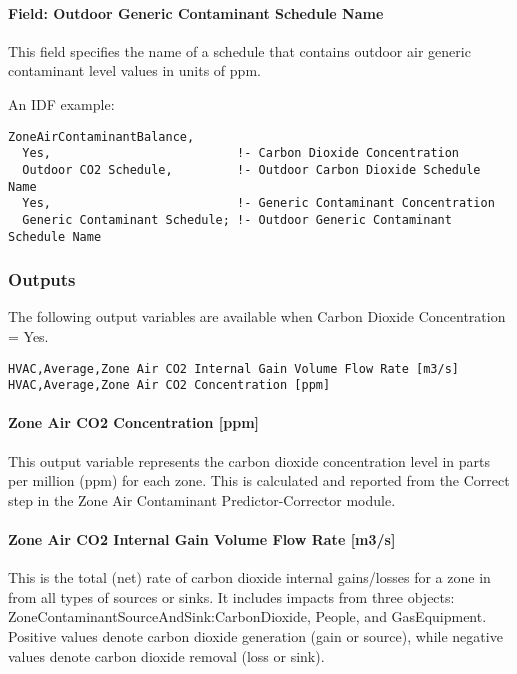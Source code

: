 \paragraph{Field: Outdoor Generic Contaminant Schedule Name}\label{field-outdoor-generic-contaminant-schedule-name}

This field specifies the name of a schedule that contains outdoor air generic contaminant level values in units of ppm.

An IDF example:

\begin{lstlisting}
ZoneAirContaminantBalance,
  Yes,                          !- Carbon Dioxide Concentration
  Outdoor CO2 Schedule,         !- Outdoor Carbon Dioxide Schedule Name
  Yes,                          !- Generic Contaminant Concentration
  Generic Contaminant Schedule; !- Outdoor Generic Contaminant Schedule Name
\end{lstlisting}

\subsubsection{Outputs}\label{outputs-033}

The following output variables are available when Carbon Dioxide Concentration = Yes.

\begin{lstlisting}
HVAC,Average,Zone Air CO2 Internal Gain Volume Flow Rate [m3/s]
HVAC,Average,Zone Air CO2 Concentration [ppm]
\end{lstlisting}

\paragraph{Zone Air CO2 Concentration {[}ppm{]}}\label{zone-air-co2-concentration-ppm}

This output variable represents the carbon dioxide concentration level in parts per million (ppm) for each zone. This is calculated and reported from the Correct step in the Zone Air Contaminant Predictor-Corrector module.

\paragraph{Zone Air CO2 Internal Gain Volume Flow Rate {[}m3/s{]}}\label{zone-air-co2-internal-gain-volume-flow-rate-m3s}

This is the total (net) rate of carbon dioxide internal gains/losses for a zone in \si{\volumeFlowRate} from all types of sources or sinks. It includes impacts from three objects: ZoneContaminantSourceAndSink:CarbonDioxide, People, and GasEquipment. Positive values denote carbon dioxide generation (gain or source), while negative values denote carbon dioxide removal (loss or sink).

